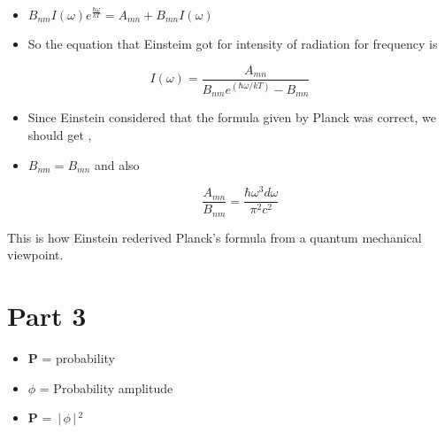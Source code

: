 \documentclass[aspectratio=169]{beamer}
\begin{document}
\begin{frame}{}

	\begin{itemize}

		\item $ B_{nm} I(\omega) e^{\frac{\hbar \omega}{kT}} = A_{mn} + B_{mn} I(\omega) $ \newline
		\item So the equation that Einsteim got for intensity of radiation for frequency is 
		
	\end{itemize}
	
		\begin{equation}
				 I(\omega) = \frac{A_{mn}}{B_{nm} e^{(\hbar \omega/kT)} - B_{mn} }
		\end{equation}
		
\end{frame}

\begin{frame}{}

	\begin{itemize}

		\item Since Einstein considered that the formula given by Planck was correct, we should get , \newline
		\item  $ B_{nm} = B_{mn} $  and also
		
			\begin{flushleft}
			
				 \[\frac{A_{mn}}{B_{nm}} = \frac{\hbar \omega^3 d\omega}{ \pi^2 c^2} \] 

			\end{flushleft}
			
	\end{itemize}
	
\end{frame}

\begin{frame}{}

	{\Large This is how Einstein rederived Planck's formula from a quantum mechanical viewpoint.}
		
\end{frame}

\section{\textbf{Part 3}}

\begin{frame}{}

	\begin{itemize}

		\item \textbf{P} = probability\newline
		\item $ \phi $ = Probability amplitude \newline
		\item \textbf{P} = $ \,\Bigr\rvert\,\phi \,\Bigr\rvert\,^{2} $ 
		
	\end{itemize}
	
\end{frame}
\end{document}
